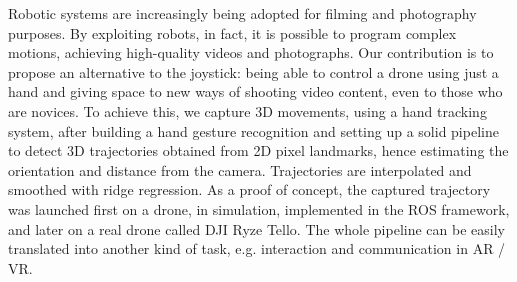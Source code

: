 Robotic systems are increasingly being adopted for filming and photography purposes. By exploiting robots, in fact, it is possible to program complex motions, achieving high-quality videos and photographs. Our contribution is to propose an alternative to the joystick: being able to control a drone using just a hand and giving space to new ways of shooting video content, even to those who are novices. To achieve this, we capture 3D movements, using a hand tracking system, after building a hand gesture recognition and setting up a solid pipeline to detect 3D trajectories obtained from 2D pixel landmarks, hence estimating the orientation and distance from the camera. Trajectories are interpolated and smoothed with ridge regression. As a proof of concept, the captured trajectory was launched first on a drone, in simulation, implemented in the ROS framework, and later on a real drone called DJI Ryze Tello. The whole pipeline can be easily translated into another kind of task, e.g. interaction and communication in AR / VR.
